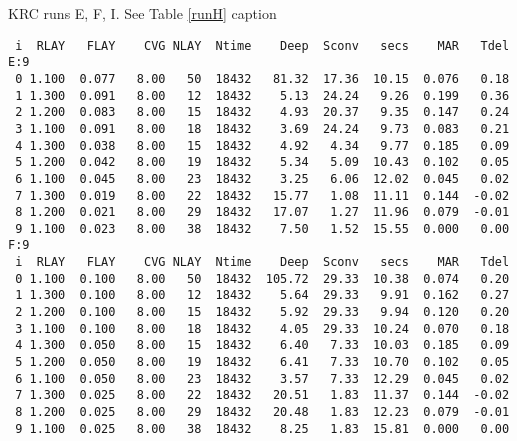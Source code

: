 \documentclass{article}
\begin{document}
\begin{table} \caption[KRC runs E, F, I]{KRC runs E, F, I. See Table \ref{runH} caption}   \label{runE}
\begin{verbatim}
 i  RLAY   FLAY    CVG NLAY  Ntime    Deep  Sconv   secs    MAR   Tdel
E:9
 0 1.100  0.077   8.00   50  18432   81.32  17.36  10.15  0.076   0.18
 1 1.300  0.091   8.00   12  18432    5.13  24.24   9.26  0.199   0.36
 2 1.200  0.083   8.00   15  18432    4.93  20.37   9.35  0.147   0.24
 3 1.100  0.091   8.00   18  18432    3.69  24.24   9.73  0.083   0.21
 4 1.300  0.038   8.00   15  18432    4.92   4.34   9.77  0.185   0.09
 5 1.200  0.042   8.00   19  18432    5.34   5.09  10.43  0.102   0.05
 6 1.100  0.045   8.00   23  18432    3.25   6.06  12.02  0.045   0.02
 7 1.300  0.019   8.00   22  18432   15.77   1.08  11.11  0.144  -0.02
 8 1.200  0.021   8.00   29  18432   17.07   1.27  11.96  0.079  -0.01
 9 1.100  0.023   8.00   38  18432    7.50   1.52  15.55  0.000   0.00
F:9
 i  RLAY   FLAY    CVG NLAY  Ntime    Deep  Sconv   secs    MAR   Tdel
 0 1.100  0.100   8.00   50  18432  105.72  29.33  10.38  0.074   0.20
 1 1.300  0.100   8.00   12  18432    5.64  29.33   9.91  0.162   0.27
 2 1.200  0.100   8.00   15  18432    5.92  29.33   9.94  0.120   0.20
 3 1.100  0.100   8.00   18  18432    4.05  29.33  10.24  0.070   0.18
 4 1.300  0.050   8.00   15  18432    6.40   7.33  10.03  0.185   0.09
 5 1.200  0.050   8.00   19  18432    6.41   7.33  10.70  0.102   0.05
 6 1.100  0.050   8.00   23  18432    3.57   7.33  12.29  0.045   0.02
 7 1.300  0.025   8.00   22  18432   20.51   1.83  11.37  0.144  -0.02
 8 1.200  0.025   8.00   29  18432   20.48   1.83  12.23  0.079  -0.01
 9 1.100  0.025   8.00   38  18432    8.25   1.83  15.81  0.000   0.00


\end{verbatim}
\end{table}
\end{document}
